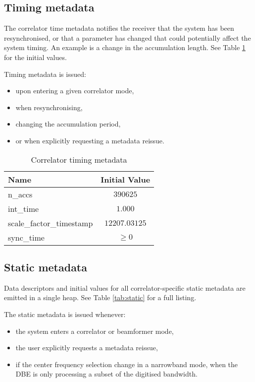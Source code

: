 \documentclass[11pt,english,twoside]{article}
\begin{document}
\subsection{Timing metadata}
The correlator time metadata notifies the receiver that the system has been resynchronised, or that a parameter has changed that could
potentially affect the system timing. An example is a change in the accumulation length. See Table \ref{tab:timing} for the initial values.

Timing metadata is issued:
\begin{itemize}
\item upon entering a given correlator mode,
\item when resynchronising,
\item changing the accumulation period,
\item or when explicitly requesting a metadata reissue.
\end{itemize}

\begin{table}[htdp]
\caption{Correlator timing metadata}
\begin{center}
\begin{tabular}{|l|c|} \hline
{\bf Name}       & {\bf Initial Value} \\ \hline
n\_accs    & $390625$ \\ \hline
int\_time  & $1.000$ \\ \hline
scale\_factor\_timestamp & $12207.03125$ \\ \hline
sync\_time & $\geq 0$ \\ \hline
\end{tabular}
\end{center}
\label{tab:timing}
\end{table}%


\subsection{Static metadata}
Data descriptors and initial values for all correlator-specific static metadata are emitted in a single heap. See Table \ref{tab:static} for a
full listing.

The static metadata is issued whenever:
\begin{itemize}
\item the system enters a correlator or beamformer mode,
\item the user explicitly requests a metadata reissue,
\item if the center frequency selection change in a narrowband mode, when the DBE is only processing a subset of the digitised bandwidth.
\end{itemize}
\end{document}

